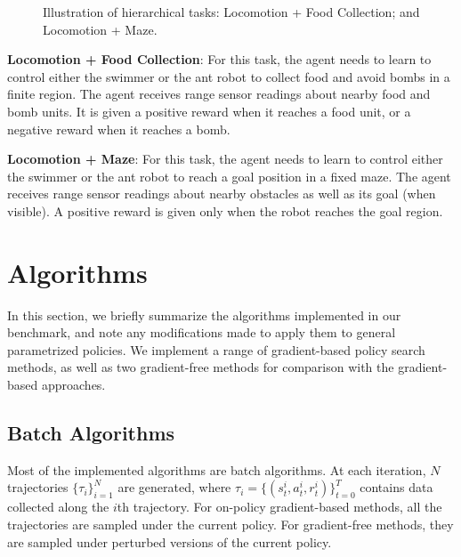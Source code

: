 \documentclass{article}
\begin{document}
\begin{figure}[!h]
\centering
{}
\caption{Illustration of hierarchical tasks:  Locomotion + Food Collection; and  Locomotion + Maze.}\label{fig:plots_hierarchical_tasks}
\end{figure}





{\bf Locomotion + Food Collection}: For this task, the agent needs to learn to control either the swimmer or the ant robot to collect food and avoid bombs in a finite region. The agent receives range sensor readings about nearby food and bomb units. It is given a positive reward when it reaches a food unit, or a negative reward when it reaches a bomb.


{\bf Locomotion + Maze}: For this task, the agent needs to learn to control either the swimmer or the ant robot  to reach a goal position in a fixed maze. The agent receives range sensor readings about nearby obstacles as well as its goal (when visible). A positive reward is given only when the robot reaches the goal region.







\section{Algorithms}

In this section, we briefly summarize the algorithms implemented in our benchmark, and note any modifications made to apply them to general parametrized policies. We implement a range of gradient-based policy search methods, as well as two gradient-free methods for comparison with the gradient-based approaches.




\subsection{Batch Algorithms}
Most of the implemented algorithms are batch algorithms. At each iteration, $N$ trajectories $\{ \tau_i\}_{i=1}^N$ are generated, where
$\tau_i =\{ (s_t^i, a_t^i, r_t^i)\}_{t=0}^T$ contains data collected along the $i$th trajectory. For on-policy gradient-based methods, all the trajectories are sampled under the current policy. For gradient-free methods, they are sampled under perturbed versions of the current policy.
    
\end{document}

